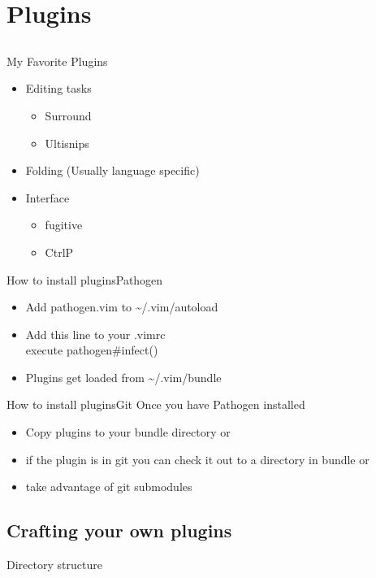\documentclass{beamer}
\begin{document}
    \section{Plugins}
    \subsection{}
    \begin{frame}{My Favorite Plugins}
        \begin{itemize}
            \item Editing tasks
                \begin{itemize}
                    \item Surround
                    \item Ultisnips
                \end{itemize}
            \item Folding (Usually language specific)
            \item Interface
                \begin{itemize}
                    \item fugitive
                    \item CtrlP
                \end{itemize}
        \end{itemize}
    \end{frame}
    \begin{frame}{How to install plugins}{Pathogen}
        \begin{itemize}
            \item Add pathogen.vim to \textasciitilde/.vim/autoload
            \item Add this line to your .vimrc\\
                \quad execute pathogen\#infect()
            \item Plugins get loaded from \textasciitilde/.vim/bundle
        \end{itemize}
    \end{frame}
    \begin{frame}{How to install plugins}{Git}
        Once you have Pathogen installed
        \begin{itemize}
            \item Copy plugins to your bundle directory or
            \item if the plugin is in git you can check it out to a directory in bundle or
            \item take advantage of git submodules
        \end{itemize}
    \end{frame}
    \subsection{Crafting your own plugins}
    \begin{frame}{Directory structure}
    \end{frame}
\end{document}
